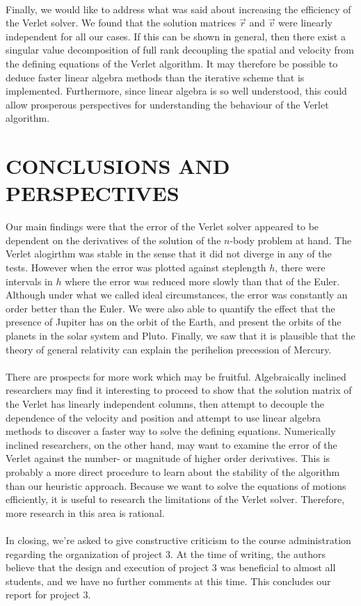 \documentclass[11pt,english,a4paper]{article}
\begin{document}
\\
Finally, we would like to address what was said about increasing the efficiency of the Verlet solver. We found that the solution matrices $\vec{r}$ and $\vec{v}$ were linearly independent for all our cases. If this can be shown in general, then there exist a singular value decomposition of full rank \parencite[417]{lay_linear_2012} decoupling the spatial and velocity from the defining equations of the Verlet algorithm. It may therefore be possible to deduce faster linear algebra methods than the iterative scheme that is implemented. Furthermore, since linear algebra is so well understood, this could allow prosperous perspectives for understanding the behaviour of the Verlet algorithm.

\section*{\uppercase{Conclusions and perspectives}}
Our main findings were that the error of the Verlet solver appeared to be dependent on the derivatives of the solution of the $n$-body problem at hand. The Verlet alogirthm was stable in the sense that it did not diverge in any of the tests. However when the error was plotted against steplength $h$, there were intervals in $h$ where the error was reduced more slowly than that of the Euler. Although under what we called ideal circumstances, the error was constantly an order better than the Euler. We were also able to quantify the effect that the presence of Jupiter has on the orbit of the Earth, and present the orbits of the planets in the solar system and Pluto. Finally, we saw that it is plausible that the theory of general relativity can explain the perihelion precession of Mercury.\\
\\
There are prospects for more work which may be fruitful. Algebraically inclined researchers may find it interesting to proceed to show that the solution matrix of the Verlet has linearly independent columns, then attempt to decouple the dependence of the velocity and position and attempt to use linear algebra methods to discover a faster way to solve the defining equations. Numerically inclined researchers, on the other hand, may want to examine the error of the Verlet against the number- or magnitude of higher order derivatives. This is probably a more direct procedure to learn about the stability of the algorithm than our heuristic approach. Because we want to solve the equations of motions efficiently, it is useful to research the limitations of the Verlet solver. Therefore, more research in this area is rational.\\
\\
In closing, we're asked to give constructive criticism to the course administration regarding the organization of project 3. At the time of writing, the authors believe that the design and execution of project 3 was beneficial to almost all students, and we have no further comments at this time. This concludes our report for project 3.

\printbibliography
\end{document}
